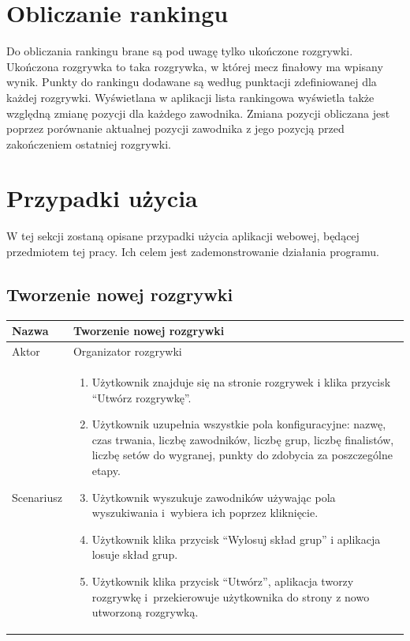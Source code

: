 \documentclass[shortabstract]{iithesis}
\begin{document}
\section{Obliczanie rankingu}
Do obliczania rankingu brane są pod uwagę tylko ukończone rozgrywki.
Ukończona rozgrywka to taka rozgrywka, w której mecz finałowy ma wpisany wynik.
Punkty do rankingu dodawane są według punktacji zdefiniowanej dla każdej rozgrywki.
Wyświetlana w aplikacji lista rankingowa wyświetla także względną zmianę pozycji dla każdego zawodnika.
Zmiana pozycji obliczana jest poprzez porównanie aktualnej pozycji zawodnika z jego pozycją przed zakończeniem ostatniej rozgrywki.



\section{Przypadki użycia}
W tej sekcji zostaną opisane przypadki użycia aplikacji webowej, będącej przedmiotem tej pracy.
Ich celem jest zademonstrowanie działania programu.
\subsection{Tworzenie nowej rozgrywki}
\begin{tabular}{|l|p{12cm}|}
    \hline
    Nazwa      & Tworzenie nowej rozgrywki                                                                                                                                                               \\
    \hline
    Aktor      & Organizator rozgrywki                                                                                                                                                                   \\
    \hline
    Scenariusz &
    \begin{enumerate}[nosep,leftmargin=*,rightmargin=8pt,before=\vspace{-7.5pt},after=\vspace{-8pt}]
        \item Użytkownik znajduje się na stronie rozgrywek i klika przycisk ``Utwórz rozgrywkę''.
        \item Użytkownik uzupełnia wszystkie pola konfiguracyjne: nazwę, czas trwania, liczbę zawodników, liczbę grup, liczbę finalistów, liczbę setów do wygranej, punkty do zdobycia za poszczególne etapy.
        \item Użytkownik wyszukuje zawodników używając pola wyszukiwania i~wybiera ich poprzez kliknięcie.
        \item Użytkownik klika przycisk ``Wylosuj skład grup'' i aplikacja losuje skład grup.
        \item Użytkownik klika przycisk ``Utwórz'', aplikacja tworzy rozgrywkę i~przekierowuje użytkownika do strony z nowo utworzoną rozgrywką.
    \end{enumerate} \\
    \hline
\end{tabular}
\end{document}
